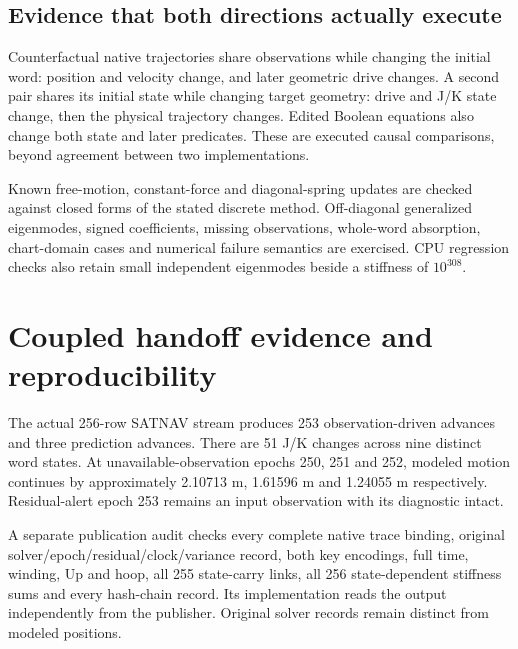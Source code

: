 \subsection{Evidence that both directions actually execute}
Counterfactual native trajectories share observations while changing the initial
word: position and velocity change, and later geometric drive changes. A second
pair shares its initial state while changing target geometry: drive and J/K state
change, then the physical trajectory changes. Edited Boolean equations also change
both state and later predicates. These are executed causal comparisons, beyond
agreement between two implementations.

Known free-motion, constant-force and diagonal-spring updates are checked against
closed forms of the stated discrete method. Off-diagonal generalized eigenmodes,
signed coefficients, missing observations, whole-word absorption, chart-domain
cases and numerical failure semantics are exercised. CPU regression checks also
retain small independent eigenmodes beside a stiffness of $10^{308}$.
\clearpage

\section{Coupled handoff evidence and reproducibility}
The actual 256-row SATNAV stream produces 253 observation-driven advances and three
prediction advances. There are 51 J/K changes across nine distinct word states.
At unavailable-observation epochs 250, 251 and 252, modeled motion continues by
approximately 2.10713 m, 1.61596 m and 1.24055 m respectively. Residual-alert epoch
253 remains an input observation with its diagnostic intact.

A separate publication audit checks every complete native trace binding, original
solver/epoch/residual/clock/variance record, both key encodings, full time, winding,
Up and hoop, all 255 state-carry links, all 256 state-dependent stiffness sums and
every hash-chain record. Its implementation reads the output independently from
the publisher. Original solver records remain distinct from modeled positions.


